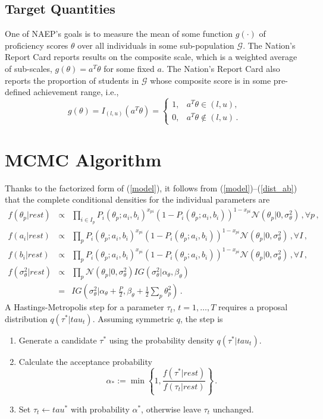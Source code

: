 \documentclass{article}
\newcommand{\Normal}{\mathcal{N}}
\newcommand{\G}{\mathcal{G}}
\newcommand{\st}{\sigma_{\ta}^2}
\newcommand{\ta}{\theta}
\begin{document}
\subsection{Target Quantities}
One of NAEP's goals is to measure the mean of some function $g(\cdot)$ of proficiency scores $\ta$ over all individuals in some sub-population $\G$. The Nation's Report Card reports results on the composite scale, which is a weighted average of sub-scales, $g(\ta) = a^T \ta$ for some fixed $a$. The Nation's Report Card also reports the proportion of students in $\G$ whose composite score is in some pre-defined achievement range, i.e.,
\begin{equation}
	g(\ta) = I_{(l,u)}(a^T \ta) =
  \begin{cases}
    1, & a^T \ta \in (l,u), \\
    0, & a^T \ta \not \in (l,u)\,.
  \end{cases}
\end{equation}

\section{MCMC Algorithm}
Thanks to the factorized form of (\ref{model}), it follows from (\ref{model})--(\ref{dist_ab}) that the complete conditional densities for the individual parameters are
\begin{eqnarray}
  f(\ta_p|rest) &\propto& \prod_{i \in I_p} 
  P_i(\ta_p;a_i,b_i)^{x_{pi}} 
  \left(1 - P_i(\ta_p;a_i,b_i)\right)^{1-x_{pi}} 
  \Normal(\ta_p|0,\st)\,, \forall p\,,
  \label{cond_ta}
  \\
  f(a_i|rest) &\propto& \prod_{p} 
  P_i(\ta_p;a_i,b_i)^{x_{pi}} 
  \left(1 - P_i(\ta_p;a_i,b_i)\right)^{1-x_{pi}} 
  \Normal(\ta_p|0,\st)\,, \forall I\,,
  \label{cond_a}
  \\
  f(b_i|rest) &\propto& \prod_{p} 
  P_i(\ta_p;a_i,b_i)^{x_{pi}} 
  \left(1 - P_i(\ta_p;a_i,b_i)\right)^{1-x_{pi}} 
  \Normal(\ta_p|0,\st)\,, \forall I\,,
  \label{cond_b}
  \\
  f(\st|rest) &\propto& \prod_{p} 
  \Normal(\ta_p|0,\st) IG(\st|\alpha_{\ta},\beta_{\ta}) \\
  &=& IG\left(\st|\alpha_{\ta} + \frac{P}{2}, \beta_{\ta} + \frac12 \sum_p \ta_p^2\right)\,.
  \label{cond_st}
\end{eqnarray}
A Hastings-Metropolis step for a parameter $\tau_t$, $t=1,\dots,T$ requires a proposal distribution $q(\tau^*|tau_t)$. Assuming symmetric $q$, the step is
\begin{enumerate}
	\item Generate a candidate $\tau^*$ using the probability density $q(\tau^*|tau_t)$.
	\item Calculate the acceptance probability
	\begin{equation}
		\alpha_* := \min\left\{1, \frac{f(\tau^*|rest)}{f(\tau_t|rest)} \right\}\,.
	\end{equation}
	\item Set $\tau_t \leftarrow tau^*$ with probability $\alpha^*$, otherwise leave $\tau_t$ unchanged.
\end{enumerate}
\end{document}
